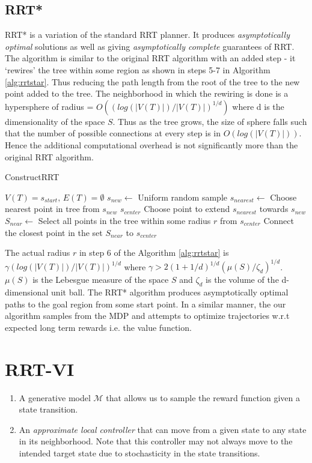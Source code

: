 \documentclass{article} %
\begin{document}
\subsection{RRT*}
RRT* is a variation of the standard RRT planner. It produces \emph{asymptotically optimal} solutions as well as giving \emph{asymptotically complete} guarantees of RRT\cite{rrtstar}. The algorithm is similar to the original RRT algorithm with an added step - it `rewires' the tree within some region as shown in steps 5-7 in Algorithm \ref{alg:rrtstar}. Thus reducing the path length from the root of the tree to the new point added to the tree. The neighborhood in which the rewiring is done is a hypersphere of radius = $O((log(|V(T)|)/|V(T)|)^{1/d})$ where d is the dimensionality of the space $S$. Thus as the tree grows, the size of sphere falls such that the number of possible connections at every step is in $O(log(|V(T)|))$. Hence the additional computational overhead is not significantly more than the original RRT algorithm. 
\begin{algorithm}
\caption{ConstructRRT}
\label{alg:rrtstar}
\begin{algorithmic}[1]
\State $V(T)=s_{start},\,E(T)=\emptyset$
\Repeat 
	\State $s_{new}\leftarrow $ Uniform random sample
	\State $s_{nearest}\leftarrow $ Choose nearest point in tree from $s_{new}$
	\State $s_{center}$ Choose point to extend $s_{nearest}$ towards $s_{new}$
	\State $S_{near}\leftarrow $ Select all points in the tree within some radius $r$ from $s_{center}$
	\State Connect the closest point in the set $S_{near}$ to $s_{center}$
\end{algorithmic}
\end{algorithm}
The actual radius $r$ in step 6 of the Algorithm \ref{alg:rrtstar} is $\gamma(log(|V(T)|)/|V(T)|)^{1/d}$ where $\gamma > 2(1+1/d)^{1/d}(\mu(S)/\zeta_d)^{1/d} $. $\mu(S)$ is the Lebesgue measure of the space $S$ and $\zeta_d$ is the volume of the d-dimensional unit ball. 
The RRT* algorithm produces asymptotically optimal paths to the goal region from some start point. In a similar manner, the our algorithm samples from the MDP and attempts to optimize trajectories w.r.t expected long term rewards i.e. the value function.

\section{RRT-VI}
\begin{enumerate}
\item A generative model $\mathcal{M}$ that allows us to sample the reward function given a state transition.
\item An \textit{approximate local controller} that can move from a given state to any state in its neighborhood. Note that this controller may not always move to the intended target state due to stochasticity in the state transitions.
\end{enumerate}
\end{document}
